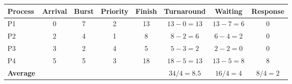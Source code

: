 \begin{tabular}{@{}lccccccc@{}}
\toprule
\textbf{Process} & \textbf{Arrival} & \textbf{Burst} & \textbf{Priority} & \textbf{Finish} & \textbf{Turnaround} & \textbf{Waiting} & \textbf{Response}\\
\midrule
P1 & 0 & 7 & 2 & 13 & $13-0=13$ & $13-7=6$ & 0\\
P2 & 2 & 4 & 1 & 8 & $8-2=6$ & $6-4=2$ & 0\\
P3 & 3 & 2 & 4 & 5 & $5-3=2$ & $2-2=0$ & 0\\
P4 & 5 & 5 & 3 & 18 & $18-5=13$ & $13-5=8$ & 8\\
\midrule
\textbf{Average} &  &  &  &  & $34/4=8.5$ & $16/4=4$ & $8/4=2$\\
\bottomrule
\end{tabular}
